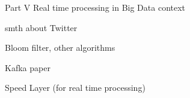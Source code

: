 Part V Real time processing in Big Data context

smth about Twitter

Bloom filter, other algorithms

Kafka paper

Speed Layer (for real time processing)